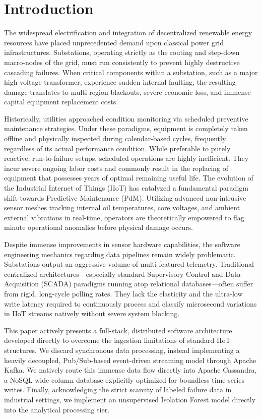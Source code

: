 \documentclass[12pt, a4paper]{article}
\begin{document}
\newpage

\section{Introduction}

The widespread electrification and integration of decentralized renewable energy resources have placed unprecedented demand upon classical power grid infrastructures. Substations, operating strictly as the routing and step-down macro-nodes of the grid, must run consistently to prevent highly destructive cascading failures. When critical components within a substation, such as a major high-voltage transformer, experience sudden internal faulting, the resulting damage translates to multi-region blackouts, severe economic loss, and immense capital equipment replacement costs. 

Historically, utilities approached condition monitoring via scheduled preventive maintenance strategies. Under these paradigms, equipment is completely taken offline and physically inspected during calendar-based cycles, frequently regardless of its actual performance condition. While preferable to purely reactive, run-to-failure setups, scheduled operations are highly inefficient. They incur severe ongoing labor costs and commonly result in the replacing of equipment that possesses years of optimal remaining useful life. The evolution of the Industrial Internet of Things (IIoT) has catalyzed a fundamental paradigm shift towards Predictive Maintenance (PdM). Utilizing advanced non-intrusive sensor meshes tracking internal oil temperatures, core voltages, and ambient external vibrations in real-time, operators are theoretically empowered to flag minute operational anomalies before physical damage occurs.

Despite immense improvements in sensor hardware capabilities, the software engineering mechanics regarding data pipelines remain widely problematic. Substations output an aggressive volume of multi-featured telemetry. Traditional centralized architectures—especially standard Supervisory Control and Data Acquisition (SCADA) paradigms running atop relational databases—often suffer from rigid, long-cycle polling rates. They lack the elasticity and the ultra-low write latency required to continuously process and classify microsecond variations in IIoT streams natively without severe system blocking. 

This paper actively presents a full-stack, distributed software architecture developed directly to overcome the ingestion limitations of standard IIoT structures. We discard synchronous data processing, instead implementing a heavily decoupled, Pub/Sub-based event-driven streaming model through Apache Kafka. We natively route this immense data flow directly into Apache Cassandra, a NoSQL wide-column database explicitly optimized for boundless time-series writes. Finally, acknowledging the strict scarcity of labeled failure data in industrial settings, we implement an unsupervised Isolation Forest model directly into the analytical processing tier.
\end{document}
